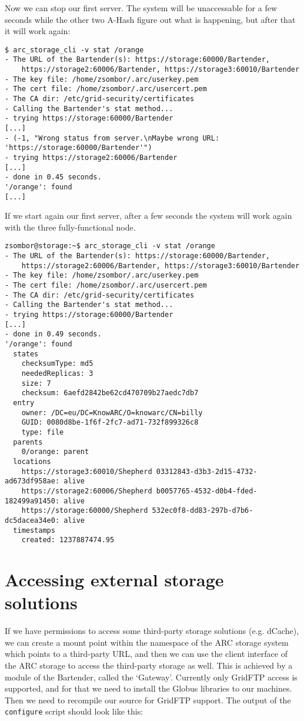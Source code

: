 \documentclass{book}
\begin{document}
Now we can stop our first server. The system will be unaccessable for a few seconds while the other two A-Hash figure out what is happening, but after that it will work again:

\begin{verbatim}
$ arc_storage_cli -v stat /orange
- The URL of the Bartender(s): https://storage:60000/Bartender,
    https://storage2:60006/Bartender, https://storage3:60010/Bartender
- The key file: /home/zsombor/.arc/userkey.pem
- The cert file: /home/zsombor/.arc/usercert.pem
- The CA dir: /etc/grid-security/certificates
- Calling the Bartender's stat method...
- trying https://storage:60000/Bartender
[...]
- (-1, "Wrong status from server.\nMaybe wrong URL: 'https://storage:60000/Bartender'")
- trying https://storage2:60006/Bartender
[...]
- done in 0.45 seconds.
'/orange': found
[...]
\end{verbatim}

If we start again our first server, after a few seconds the system will work again with the three fully-functional node.

\begin{verbatim}
zsombor@storage:~$ arc_storage_cli -v stat /orange
- The URL of the Bartender(s): https://storage:60000/Bartender,
    https://storage2:60006/Bartender, https://storage3:60010/Bartender
- The key file: /home/zsombor/.arc/userkey.pem
- The cert file: /home/zsombor/.arc/usercert.pem
- The CA dir: /etc/grid-security/certificates
- Calling the Bartender's stat method...
- trying https://storage:60000/Bartender
[...]
- done in 0.49 seconds.
'/orange': found
  states
    checksumType: md5
    neededReplicas: 3
    size: 7
    checksum: 6aefd2842be62cd470709b27aedc7db7
  entry
    owner: /DC=eu/DC=KnowARC/O=knowarc/CN=billy
    GUID: 0080d8be-1f6f-2fc7-ad71-732f899326c8
    type: file
  parents
    0/orange: parent
  locations
    https://storage3:60010/Shepherd 03312843-d3b3-2d15-4732-ad673df958ae: alive
    https://storage2:60006/Shepherd b0057765-4532-d0b4-fded-182499a91450: alive
    https://storage:60000/Shepherd 532ec0f8-dd83-297b-d7b6-dc5dacea34e0: alive
  timestamps
    created: 1237887474.95    
\end{verbatim}

\section{Accessing external storage solutions} %
\label{sec:using_the_gateway}

If we have permissions to access some third-party storage solutions (e.g. dCache), we can create a mount point within the namespace of the ARC storage system which points to a third-party URL, and then we can use the client interface of the ARC storage to access the third-party storage as well. This is achieved by a module of the Bartender, called the `Gateway'. Currently only GridFTP access is supported, and for that we need to install the Globus libraries to our machines. Then we need to recompile our source for GridFTP support. The output of the \verb!configure! script should look like this:
\end{document}
